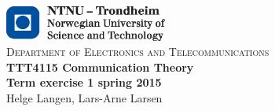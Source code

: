 \begin{titlepage}

	\begin{center}~
		\\[5cm]

		\includegraphics[width=0.4\textwidth]{./img/logo_ntnu_eng}~
		\\[0.3cm]
		\textsc{ Department of Electronics and Telecommunications}~
		\\[2cm]

		{ \huge \bfseries TTT4115 Communication Theory \\[0.5cm]
		Term exercise 1 spring 2015 }~
		\\[1.5cm]
		

		{ \LARGE Helge Langen, Lars-Arne Larsen}
	\end{center}


\end{titlepage}
